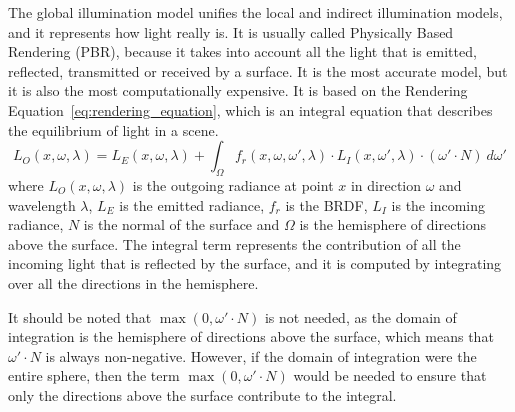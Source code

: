 The global illumination model unifies the local and indirect illumination models, and it represents how light really is. It is usually called Physically Based Rendering (PBR), because it takes into account all the light that is emitted, reflected, transmitted or received by a surface. It is the most accurate model, but it is also the most computationally expensive. It is based on the Rendering Equation~\eqref{eq:rendering_equation}, which is an integral equation that describes the equilibrium of light in a scene.
\begin{equation}
L_O(x, \omega, \lambda) = L_E(x, \omega, \lambda) + \int_{\Omega} f_r(x, \omega, \omega', \lambda) \cdot L_I(x, \omega', \lambda) \cdot (\omega' \cdot N) \ d\omega'
\label{eq:rendering_equation}
\end{equation}
where $L_O(x, \omega, \lambda)$ is the outgoing radiance at point $x$ in direction $\omega$ and wavelength $\lambda$, $L_E$ is the emitted radiance, $f_r$ is the BRDF, $L_I$ is the incoming radiance, $N$ is the normal of the surface and $\Omega$ is the hemisphere of directions above the surface. The integral term represents the contribution of all the incoming light that is reflected by the surface, and it is computed by integrating over all the directions in the hemisphere.
\begin{observacion}
    It should be noted that $\max(0,\omega'\cdot N)$ is not needed, as the domain of integration is the hemisphere of directions above the surface, which means that $\omega'\cdot N$ is always non-negative. However, if the domain of integration were the entire sphere, then the term $\max(0,\omega'\cdot N)$ would be needed to ensure that only the directions above the surface contribute to the integral.
\end{observacion}

